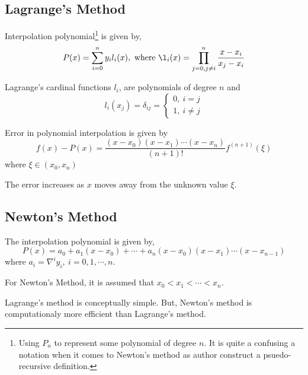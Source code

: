 \subsection{Lagrange's Method}
Interpolation polynomial\footnote{Using $P_n$ to represent some polynomial of degree $n$. It is quite a confusing a notation when it comes to Newton's method as author construct a psuedo-recursive definition.} is given by,
\begin{equation}
	P(x) = \sum_{i=0}^n y_i l_i(x),\text{ where } \l_i(x) = \prod_{j = 0,j \ne i}^n \frac{x-x_i}{x_j-x_i}
	\label{equ:lagrange}
\end{equation}
\begin{remark}
	Lagrange's cardinal functions $l_i$, are polynomials of degree $n$ and
	$$l_i(x_j) = \delta_{ij} = \begin{cases} 0,\ i = j \\ 1,\ i \ne j \end{cases}$$
\end{remark}
\begin{proposition}
	Error in polynomial interpolation is given by
	\begin{equation}
		f(x) - P(x) = \frac{(x-x_0)(x-x_1)\cdots(x-x_n)}{(n+1)!} f^{(n+1)}(\xi)
		\label{equ:error}
	\end{equation}
	where $\xi \in (x_0, x_n)$
\end{proposition}
\begin{remark}
	The error increases as $x$ moves away from the unknown value $\xi$.
\end{remark}

\subsection{Newton's Method}
The interpolation polynomial is given by,
\begin{equation}
	P(x) = a_0 + a_1(x-x_0) + \cdots + a_n(x-x_0)(x-x_1)\cdots(x-x_{n-1})
	\label{equ:newton}
\end{equation}
where $a_i = \nabla^i y_i,\ i = 0,1,\cdots,n$.
\begin{remark}
	For Newton's Method, it is assumed that $x_0 < x_1 < \cdots < x_n$.
\end{remark}
\begin{remark}
	 Lagrange's method is conceptually simple. But, Newton's method is computationaly more efficient than Lagrange's method.
\end{remark}
